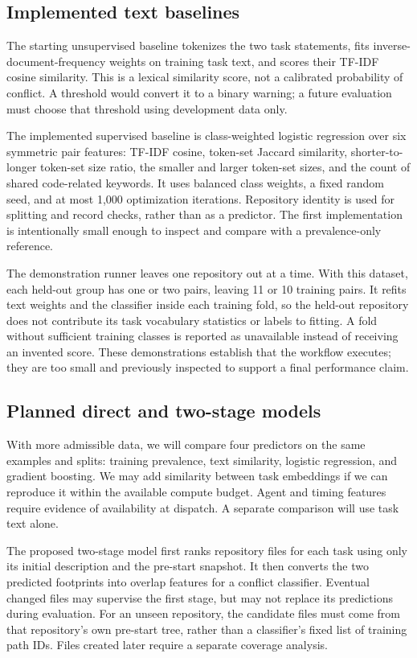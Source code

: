 \documentclass[sigconf,authorversion,nonacm]{acmart}
\begin{document}
\subsection{Implemented text baselines}
The starting unsupervised baseline tokenizes the two task statements, fits inverse-document-frequency weights on training task text, and scores their TF-IDF cosine similarity. This is a lexical similarity score, not a calibrated probability of conflict. A threshold would convert it to a binary warning; a future evaluation must choose that threshold using development data only.

The implemented supervised baseline is class-weighted logistic regression over six symmetric pair features: TF-IDF cosine, token-set Jaccard similarity, shorter-to-longer token-set size ratio, the smaller and larger token-set sizes, and the count of shared code-related keywords. It uses balanced class weights, a fixed random seed, and at most 1,000 optimization iterations. Repository identity is used for splitting and record checks, rather than as a predictor. The first implementation is intentionally small enough to inspect and compare with a prevalence-only reference.

The demonstration runner leaves one repository out at a time. With this dataset, each held-out group has one or two pairs, leaving 11 or 10 training pairs. It refits text weights and the classifier inside each training fold, so the held-out repository does not contribute its task vocabulary statistics or labels to fitting. A fold without sufficient training classes is reported as unavailable instead of receiving an invented score. These demonstrations establish that the workflow executes; they are too small and previously inspected to support a final performance claim.

\subsection{Planned direct and two-stage models}
With more admissible data, we will compare four predictors on the same examples and splits: training prevalence, text similarity, logistic regression, and gradient boosting. We may add similarity between task embeddings if we can reproduce it within the available compute budget. Agent and timing features require evidence of availability at dispatch. A separate comparison will use task text alone.

The proposed two-stage model first ranks repository files for each task using only its initial description and the pre-start snapshot. It then converts the two predicted footprints into overlap features for a conflict classifier. Eventual changed files may supervise the first stage, but may not replace its predictions during evaluation. For an unseen repository, the candidate files must come from that repository's own pre-start tree, rather than a classifier's fixed list of training path IDs. Files created later require a separate coverage analysis.
\end{document}
